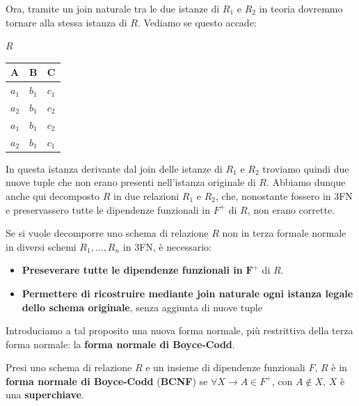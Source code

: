 \documentclass[11pt, a4paper, titlepage, oneside]{scrbook}
\begin{document}
Ora, tramite un join naturale tra le due istanze di $R_1$ e $R_2$ in teoria dovremmo tornare alla stessa istanza di $R$. Vediamo se questo accade:

\begin{center}
    $R$

\begin{tabular}{|l|l|l|}
\hline
\textbf{A} & \textbf{B} & \textbf{C}   \\ \hline
$a_1$ & $b_1$ & $c_1$ \\
$a_2$ & $b_1$ & $c_2$ \\
$a_1$ & $b_1$ & $c_2$ \\
$a_2$ & $b_1$ & $c_1$ \\
\hline
\end{tabular}
\end{center}

In questa istanza derivante dal join delle istanze di $R_1$ e $R_2$ troviamo quindi due nuove tuple che non erano presenti nell'istanza originale di $R$. Abbiamo dunque anche qui decomposto $R$ in due relazioni $R_1$ e $R_2$, che, nonostante fossero in 3FN e preservassero tutte le dipendenze funzionali in $F^+$ di $R$, non erano corrette.

\begin{Proposizione}[]
\label{propos-decomposizione}
Se si vuole decomporre uno schema di relazione $R$ non in terza formale normale in diversi schemi $R_1, \ldots, R_n$ in 3FN, è necessario: 
\begin{itemize}
    \item \textbf{Preseverare tutte le dipendenze funzionali in } $\bm{F^+}$ di $R$. 
    \item \textbf{Permettere di ricostruire mediante join naturale ogni istanza legale dello schema originale}, senza aggiunta di nuove tuple
\end{itemize}
\end{Proposizione}

Introduciamo a tal proposito una nuova forma normale, più restrittiva della terza forma normale: la \textbf{forma normale di Boyce-Codd}.

\begin{Definizione}
\label{def-forma-normale-boyce-codd}
Presi uno schema di relazione $R$ e un insieme di dipendenze funzionali $F$, $R$ è in \textbf{forma normale di Boyce-Codd} (\textbf{BCNF}) se $\forall X \longrightarrow A \in F^+$, con $A \notin X$, $X$ è una \textbf{superchiave}.
\end{Definizione}
\end{document}
